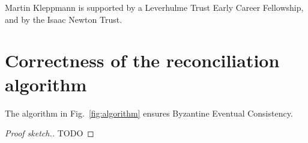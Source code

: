 \documentclass[manuscript]{acmart}
\begin{document}



\begin{acks}
Martin Kleppmann is supported by a Leverhulme Trust Early Career Fellowship, and by the Isaac Newton Trust.
\end{acks}




\appendix
\section{Correctness of the reconciliation algorithm}
\begin{theorem}
The algorithm in Fig.~\ref{fig:algorithm} ensures Byzantine Eventual Consistency.
\end{theorem}
\begin{proof}[Proof sketch.]
TODO
\end{proof}
\end{document}
